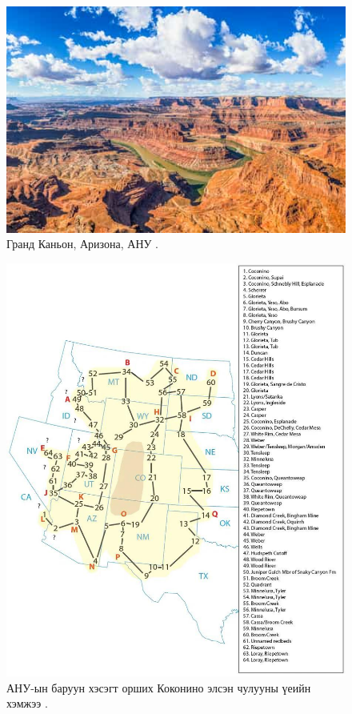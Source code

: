 \documentclass[10pt,twocolumn,letterpaper]{article}
\begin{document}
\begin{figure}[b]
\begin{center}
   \includegraphics[width=1\linewidth]{grand-canyon.jpg}

\end{center}
   \caption{Гранд Каньон, Аризона, АНУ \cite{49}.}
\label{fig:2}
\label{fig:onecol}
\end{figure}

\begin{figure}[t]
\begin{center}
   \includegraphics[width=1\linewidth]{coconino.jpg}
\end{center}
   \caption{АНУ-ын баруун хэсэгт орших Коконино элсэн чулууны үеийн хэмжээ \cite{21}.}
\label{fig:3}
\label{fig:onecol}
\end{figure}
\end{document}
